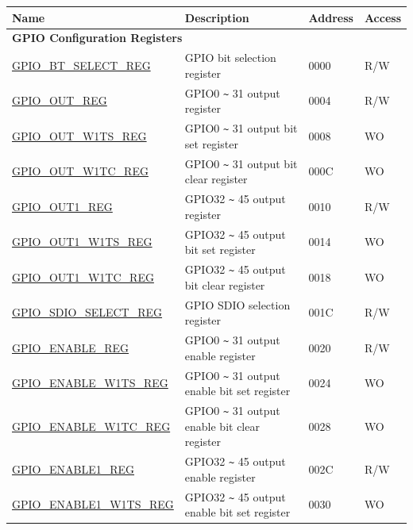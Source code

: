\begin{longtable}{ | p{6cm} | p{7.2cm} | p{1.3cm} | p{1cm} | }
\hline\rowcolor{lightgray}
Name & Description &  Address & Access \\ \hline
\endhead
\multicolumn{4}{|l|}{\textbf{GPIO Configuration Registers}} \\ \hline
\hyperref[regdesc:GPIOBTSELECTREG]{GPIO\_BT\_SELECT\_REG} & GPIO bit selection register & \hexprefix{}0000 & R/W \\ \hline
\hyperref[regdesc:GPIOOUTREG]{GPIO\_OUT\_REG} & GPIO0 \verb+~+ 31 output register & \hexprefix{}0004 & R/W \\ \hline
\hyperref[regdesc:GPIOOUTW1TSREG]{GPIO\_OUT\_W1TS\_REG} & GPIO0 \verb+~+ 31 output bit set register & \hexprefix{}0008 & WO \\ \hline
\hyperref[regdesc:GPIOOUTW1TCREG]{GPIO\_OUT\_W1TC\_REG} & GPIO0 \verb+~+ 31 output bit clear register & \hexprefix{}000C & WO \\ \hline
\hyperref[regdesc:GPIOOUT1REG]{GPIO\_OUT1\_REG} & GPIO32 \verb+~+ 45 output register & \hexprefix{}0010 & R/W \\ \hline
\hyperref[regdesc:GPIOOUT1W1TSREG]{GPIO\_OUT1\_W1TS\_REG} & GPIO32 \verb+~+ 45 output bit set register & \hexprefix{}0014 & WO \\ \hline
\hyperref[regdesc:GPIOOUT1W1TCREG]{GPIO\_OUT1\_W1TC\_REG} & GPIO32 \verb+~+ 45 output bit clear register & \hexprefix{}0018 & WO \\ \hline
\hyperref[regdesc:GPIOSDIOSELECTREG]{GPIO\_SDIO\_SELECT\_REG} & GPIO SDIO selection register & \hexprefix{}001C & R/W \\ \hline
\hyperref[regdesc:GPIOENABLEREG]{GPIO\_ENABLE\_REG} & GPIO0 \verb+~+ 31 output enable register & \hexprefix{}0020 & R/W \\ \hline
\hyperref[regdesc:GPIOENABLEW1TSREG]{GPIO\_ENABLE\_W1TS\_REG} & GPIO0 \verb+~+ 31 output enable bit set register & \hexprefix{}0024 & WO \\ \hline
\hyperref[regdesc:GPIOENABLEW1TCREG]{GPIO\_ENABLE\_W1TC\_REG} & GPIO0 \verb+~+ 31 output enable bit clear register & \hexprefix{}0028 & WO \\ \hline
\hyperref[regdesc:GPIOENABLE1REG]{GPIO\_ENABLE1\_REG} & GPIO32 \verb+~+ 45 output enable register & \hexprefix{}002C & R/W \\ \hline
\hyperref[regdesc:GPIOENABLE1W1TSREG]{GPIO\_ENABLE1\_W1TS\_REG} & GPIO32 \verb+~+ 45 output enable bit set register & \hexprefix{}0030 & WO \\ \hline

\end{longtable}
